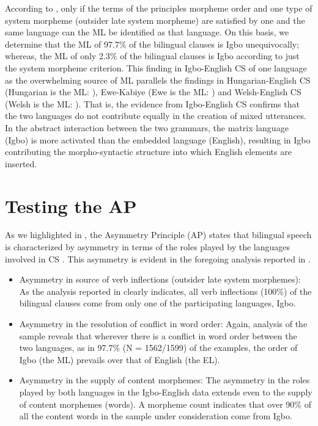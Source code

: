 \documentclass[output=paper]{langsci/langscibook}
\begin{document}
According to \citet[59]{MyersScotton2002}, only if the terms of the principles morpheme order and one type of system morpheme (outsider late system morpheme) are satisfied by one and the same language can the ML be identified as that language. On this basis, we determine that the ML of 97.7\% of the bilingual clauses is Igbo unequivocally; whereas, the ML of only 2.3\% of the bilingual clauses is Igbo according to just the system morpheme criterion. This finding in Igbo-English CS of one language as the overwhelming source of ML parallels the findings in Hungarian-English CS (Hungarian is the ML: \citealt{Bolonyai2005}), Ewe-Kabiye (Ewe is the ML: \citealt{Essizewa2007}) and Welsh-English CS (Welsh is the ML: \citealt{DaviesDeuchar2010}). That is, the evidence from Igbo-English CS confirms that the two languages do not contribute equally in the creation of mixed utterances. In the abstract interaction between the two grammars, the matrix language (Igbo) is more activated than the embedded language (English), resulting in Igbo contributing the morpho-syntactic structure into which English elements are inserted.  

\section{Testing the AP}

As we highlighted in , the Asymmetry Principle (AP) states that bilingual speech is characterized by asymmetry in terms of the roles played by the languages involved in CS \citep[9]{MyersScotton2002}. This asymmetry is evident in the foregoing analysis reported in . 

\begin{itemize}
 \item Asymmetry in source of verb inflections (outsider late system morphemes): As the analysis reported in  clearly indicates, all verb inflections (100\%) of the bilingual clauses come from only one of the participating languages, Igbo.

 \item Asymmetry in the resolution of conflict in word order: Again, analysis of the sample reveals that wherever there is a conflict in word order between the two languages, as in 97.7\% (N = 1562/1599) of the examples, the order of Igbo (the ML) prevails over that of English (the EL). 

 \item Asymmetry in the supply of content morphemes: The asymmetry in the roles played by both languages in the Igbo-English data extends even to the supply of content morphemes (words). A morpheme count indicates that over 90\% of all the content words in the sample under consideration come from Igbo.
 
\end{itemize}
 
\end{document}

